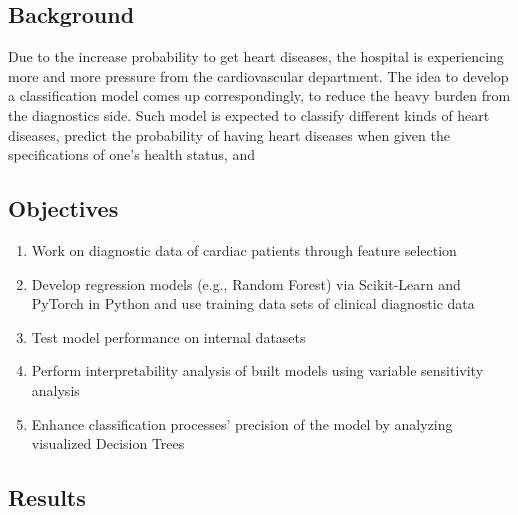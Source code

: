\documentclass[12pt]{article}
\begin{document}
\subsection{Background}

Due to the increase probability to get heart diseases, the hospital is experiencing more and more pressure from the cardiovascular department. The idea to develop a classification model comes up correspondingly, to reduce the heavy burden from the diagnostics side. Such model is expected to classify different kinds of heart diseases, predict the probability of having heart diseases when given the specifications of one's health status, and  

\subsection{Objectives}

\begin{enumerate}

    \item{\small Work on diagnostic data of cardiac patients through feature selection}
    \item{\small Develop regression models (e.g., Random Forest) via Scikit-Learn and PyTorch in Python and use training data sets of clinical diagnostic data}
    \item{\small Test model performance on internal datasets}
    \item{\small Perform interpretability analysis of built models using variable sensitivity analysis}
    \item{\small Enhance classification processes' precision of the model by analyzing visualized Decision Trees}

\end{enumerate}

\subsection{Results}
\end{document}
